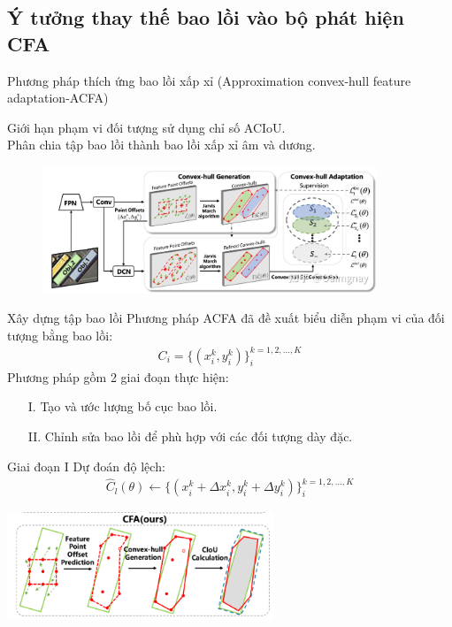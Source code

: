 \documentclass[11pt]{beamer}
\theoremstyle{definition}
\theoremstyle{plain}
\theoremstyle{plain}
\theoremstyle{remark}
\begin{document}
	\subsection{Ý tưởng thay thế bao lồi vào bộ phát hiện CFA}
	\begin{frame}{Phương pháp thích ứng bao lồi xấp xỉ (Approximation convex-hull feature adaptation-ACFA)}
	 
	 Giới hạn phạm vi đối tượng sử dụng chỉ số ACIoU.\\
	 Phân chia tập bao lồi thành bao lồi xấp xỉ âm và dương.
		\begin{figure}[htp]
			\begin{center}
				\includegraphics[width=10cm]{./Hinh_1.jpg}
			\end{center}
		\end{figure}
	\end{frame}
	\begin{frame}{Xây dựng tập bao lồi}
		Phương pháp ACFA đã đề xuất biểu diễn phạm
		vi của đối tượng bằng bao lồi:\\
		\begin{align} \label{ptdd}
			C_i = \{(x_i^k, y_i^k )\}_i^{k=1,2,...,K}
		\end{align}
		Phương pháp gồm 2 giai đoạn thực hiện:
			\begin{itemize}
			\item[I.] Tạo và ước lượng bố cục bao lồi.
			\item[II.] Chỉnh sửa bao lồi để phù hợp với các đối tượng dày đặc.
		\end{itemize}	
	\end{frame}
\begin{frame}{Giai đoạn I}
	Dự đoán độ lệch:
	\begin{align} \label{ptdd}
		\widehat C_l (\theta) \gets \{(x_i^k + \Delta x_i^k, y_i^k + \Delta y_i^k )\}_i^{k=1,2,...,K}
	\end{align}
	\begin{center}
		\includegraphics[width=8cm]{Figures/feature_point_offset_prediction}
	\end{center}
\end{frame}
\end{document}
